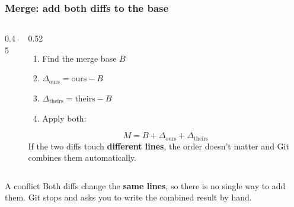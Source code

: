 \documentclass[aspectratio=169,10pt,compress]{beamer}
\begin{document}
\begin{frame}[t,fragile] \frametitle{Merge: add both diffs to the base}
  \begin{columns}[T]
    \begin{column}{0.45\textwidth}
      \centering
    \end{column}
    \begin{column}{0.52\textwidth}
      \begin{enumerate}\small
        \item Find the merge base $B$
        \item $\Delta_{\text{ours}} = \text{ours} - B$
        \item $\Delta_{\text{theirs}} = \text{theirs} - B$
        \item Apply both:
      \end{enumerate}
      \[
        M = B + \Delta_{\text{ours}} + \Delta_{\text{theirs}}
      \]
      \small
      If the two diffs touch \textbf{different lines}, the order doesn't matter and Git
      combines them automatically.
    \end{column}
  \end{columns}

  \vspace{0.5em}
  \begin{alertblock}{A conflict}
    Both diffs change the \textbf{same lines}, so there is no single way to add them.
    Git stops and asks you to write the combined result by hand.
  \end{alertblock}
\end{frame}
\end{document}
